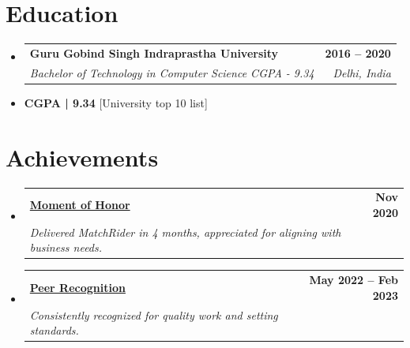 \documentclass[letterpaper,11pt]{article}
\makeatletter
\newcommand{\resumeSubheading}[4]{
  \vspace{-2pt}\item
    \begin{tabular*}{1.0\textwidth}[t]{l@{\extracolsep{\fill}}r}
      \textbf{#1} & \textbf{\small #2} \\
      \textit{\small#3} & \textit{\small #4} \\
    \end{tabular*}\vspace{-7pt}
}
\newcommand{\resumeSubHeadingListStart}{\begin{itemize}[leftmargin=0.0in, label={}]}
\newcommand{\resumeSubHeadingListEnd}{\end{itemize}}
\makeatother
\begin{document}
\section{Education}
\resumeSubHeadingListStart
\resumeSubheading{Guru Gobind Singh Indraprastha University}{2016 -- 2020}{Bachelor of Technology in Computer Science CGPA - 9.34}{Delhi, India}
\item{\textbf{CGPA | 9.34} [University top 10 list]}

\resumeSubHeadingListEnd

\section{Achievements}
\resumeSubHeadingListStart
\resumeSubheading{\href{https://drive.google.com/drive/u/1/folders/1dMF82uPbvHjp7ZFfwgRY36duLTu1IO10}{Moment of Honor \faExternalLink}}{Nov 2020}{Delivered MatchRider in 4 months, appreciated for aligning with business needs.}{}
\resumeSubheading{\href{https://drive.google.com/drive/folders/1kl8TmB8SaVZ5YwXo8xHsloigwAdjzRR5}{Peer Recognition \faExternalLink}}{May 2022 -- Feb 2023}{Consistently recognized for quality work and setting standards.}{}
\resumeSubHeadingListEnd
\end{document}
